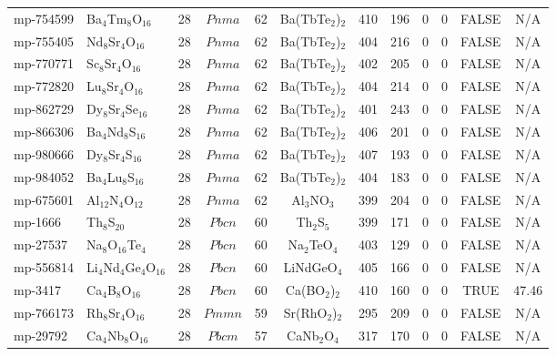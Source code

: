 {\begin{longtable}{llcccccccccc}
    mp-754599 & Ba$_{4}$Tm$_{8}$O$_{16}$ & 28    & $Pnma$ & 62    & Ba(TbTe$_{2}$)$_{2}$ & 410   & 196   & 0     & 0     & FALSE & N/A \\
    mp-755405 & Nd$_{8}$Sr$_{4}$O$_{16}$ & 28    & $Pnma$ & 62    & Ba(TbTe$_{2}$)$_{2}$ & 404   & 216   & 0     & 0     & FALSE & N/A \\
    mp-770771 & Sc$_{8}$Sr$_{4}$O$_{16}$ & 28    & $Pnma$ & 62    & Ba(TbTe$_{2}$)$_{2}$ & 402   & 205   & 0     & 0     & FALSE & N/A \\
    mp-772820 & Lu$_{8}$Sr$_{4}$O$_{16}$ & 28    & $Pnma$ & 62    & Ba(TbTe$_{2}$)$_{2}$ & 404   & 214   & 0     & 0     & FALSE & N/A \\
    mp-862729 & Dy$_{8}$Sr$_{4}$Se$_{16}$ & 28    & $Pnma$ & 62    & Ba(TbTe$_{2}$)$_{2}$ & 401   & 243   & 0     & 0     & FALSE & N/A \\
    mp-866306 & Ba$_{4}$Nd$_{8}$S$_{16}$ & 28    & $Pnma$ & 62    & Ba(TbTe$_{2}$)$_{2}$ & 406   & 201   & 0     & 0     & FALSE & N/A \\
    mp-980666 & Dy$_{8}$Sr$_{4}$S$_{16}$ & 28    & $Pnma$ & 62    & Ba(TbTe$_{2}$)$_{2}$ & 407   & 193   & 0     & 0     & FALSE & N/A \\
    mp-984052 & Ba$_{4}$Lu$_{8}$S$_{16}$ & 28    & $Pnma$ & 62    & Ba(TbTe$_{2}$)$_{2}$ & 404   & 183   & 0     & 0     & FALSE & N/A \\
    mp-675601 & Al$_{12}$N$_{4}$O$_{12}$ & 28    & $Pnma$ & 62    & Al$_{3}$NO$_{3}$ & 399   & 204   & 0     & 0     & FALSE & N/A \\
    mp-1666 & Th$_{8}$S$_{20}$ & 28    & $Pbcn$ & 60    & Th$_{2}$S$_{5}$ & 399   & 171   & 0     & 0     & FALSE & N/A \\
    mp-27537 & Na$_{8}$O$_{16}$Te$_{4}$ & 28    & $Pbcn$ & 60    & Na$_{2}$TeO$_{4}$ & 403   & 129   & 0     & 0     & FALSE & N/A \\
    mp-556814 & Li$_{4}$Nd$_{4}$Ge$_{4}$O$_{16}$ & 28    & $Pbcn$ & 60    & LiNdGeO$_{4}$ & 405   & 166   & 0     & 0     & FALSE & N/A \\
    mp-3417 & Ca$_{4}$B$_{8}$O$_{16}$ & 28    & $Pbcn$ & 60    & Ca(BO$_{2}$)$_{2}$ & 410   & 160   & 0     & 0     & TRUE  & 47.46  \\
    mp-766173 & Rh$_{8}$Sr$_{4}$O$_{16}$ & 28    & $Pmmn$ & 59    & Sr(RhO$_{2}$)$_{2}$ & 295   & 209   & 0     & 0     & FALSE & N/A \\
    mp-29792 & Ca$_{4}$Nb$_{8}$O$_{16}$ & 28    & $Pbcm$ & 57    & CaNb$_{2}$O$_{4}$ & 317   & 170   & 0     & 0     & FALSE & N/A \\

\end{longtable}}
